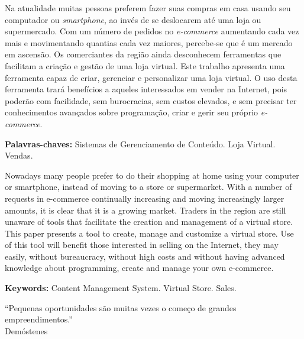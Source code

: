 \documentclass[a4paper,12pt]{monografia}
\begin{document}
Na atualidade muitas pessoas preferem fazer suas compras em casa usando seu computador ou \textit{smartphone}, ao invés de se deslocarem até uma loja ou supermercado. Com um número de pedidos no \textit{e-commerce} aumentando cada vez mais e movimentando quantias cada vez maiores, percebe-se que é um mercado em ascensão. Os comerciantes da região ainda desconhecem ferramentas que facilitam a criação e gestão de uma loja virtual. Este trabalho apresenta uma ferramenta capaz de criar, gerenciar e personalizar uma loja virtual. O uso desta ferramenta trará benefícios a aqueles interessados em vender na Internet, pois poderão com facilidade, sem burocracias, sem custos elevados, e sem precisar ter conhecimentos avançados sobre programação, criar e gerir seu próprio \textit{e-commerce}.

\noindent \textbf{Palavras-chaves:} Sistemas de Gerenciamento de Conteúdo. Loja Virtual. Vendas.

Nowadays many people prefer to do their shopping at home using your computer or smartphone, instead of moving to a store or supermarket. With a number of requests in e-commerce continually increasing and moving increasingly larger amounts, it is clear that it is a growing market. Traders in the region are still unaware of tools that facilitate the creation and management of a virtual store. This paper presents a tool to create, manage and customize a virtual store. Use of this tool will benefit those interested in selling on the Internet, they may easily, without bureaucracy, without high costs and without having advanced knowledge about programming, create and manage your own e-commerce.

\noindent \textbf{Keywords:} Content Management System. Virtual Store. Sales.
\newpage

\begin{epigrafe}
“Pequenas oportunidades são muitas vezes o começo de grandes empreendimentos.”\\
\hfill Demóstenes
\end{epigrafe}


{%
\let\oldnumberline\numberline%
\renewcommand{\numberline}{\figurename~\oldnumberline}%
\listoffigures%
\thispagestyle{empty}
}

\renewcommand\listtablename{Lista de Quadros}
\end{document}
